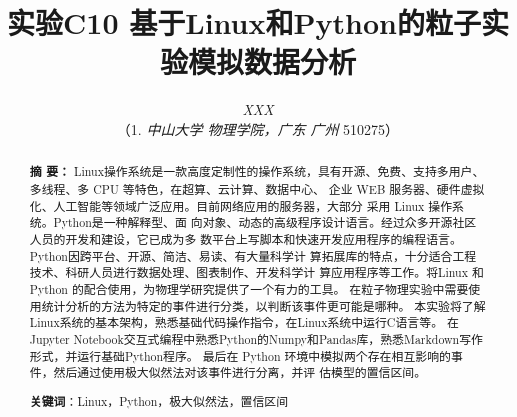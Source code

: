 \documentclass[10pt,a4paper,twoside,UTF8]{ctexart}
\begin{document}
\title{\LARGE\textbf{实验C10 基于Linux和Python的粒子实验模拟数据分析}\footnotemark[1]}
\author{\large\textit{XXX\footnotemark[2]}
\\ \normalsize{（1. \textit{中山大学 物理学院，广东 广州 }510275）}}
\date{}%


	\maketitle  %
  	\renewcommand{\abstractname} {} %
	\begin{abstract}
	\vspace{-3em}
	{\bf 摘{} 要：}
	{\small 
	Linux操作系统是一款高度定制性的操作系统，具有开源、免费、支持多用户、多线程、多 CPU 等特色，在超算、云计算、数据中心、
	企业 WEB 服务器、硬件虚拟化、人工智能等领域广泛应用。目前网络应用的服务器，大部分
	采用 Linux 操作系统。Python是一种解释型、面
	向对象、动态的高级程序设计语言。经过众多开源社区人员的开发和建设，它已成为多
	数平台上写脚本和快速开发应用程序的编程语言。Python因跨平台、开源、简洁、易读、有大量科学计
	算拓展库的特点，十分适合工程技术、科研人员进行数据处理、图表制作、开发科学计
	算应用程序等工作。将Linux 和 Python 的配合使用，为物理学研究提供了一个有力的工具。
    在粒子物理实验中需要使用统计分析的方法为特定的事件进行分类，以判断该事件更可能是哪种。
	本实验将了解Linux系统的基本架构，熟悉基础代码操作指令，在Linux系统中运行C语言等。
	在Jupyter Notebook交互式编程中熟悉Python的Numpy和Pandas库，熟悉Markdown写作形式，并运行基础Python程序。
	最后在 Python 环境中模拟两个存在相互影响的事件，然后通过使用极大似然法对该事件进行分离，并评
	估模型的置信区间。
	}
	\par%
	\textbf{关键词}：Linux，Python，极大似然法，置信区间
	\vspace{2em}
	\end{abstract}
\end{document}
